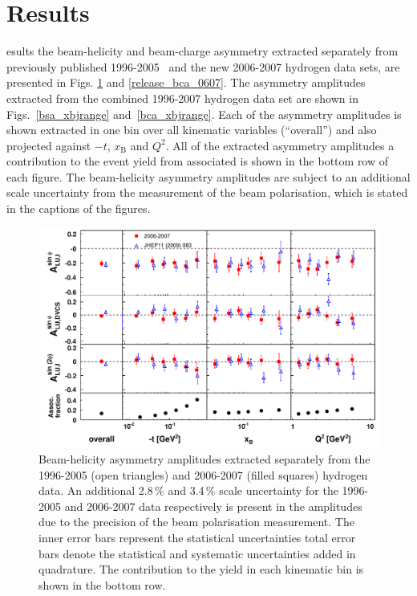 \section{Results}
esults  the beam-helicity and beam-charge asymmetry  extracted separately from previously published 1996-2005~\cite{Air09} and the new 2006-2007 hydrogen data sets, are presented in Figs. \ref{release_bsa_0607} and \ref{release_bca_0607}. The asymmetry amplitudes extracted from the combined 1996-2007 hydrogen data set are shown in Figs.~\ref{bsa_xbjrange} and~\ref{bca_xbjrange}. Each of the asymmetry amplitudes is shown extracted in one bin over all kinematic variables (``overall'') and also projected against $-t$, $x_{\textrm{B}}$ and $Q^{2}$. All of the extracted asymmetry amplitudes  a  contribution to the event yield from associated  is shown in the bottom row of each figure. The beam-helicity asymmetry amplitudes are subject to an additional scale uncertainty from the measurement of the beam polarisation, which is stated in the captions of the figures.
\begin{figure}
\begin{center}
\includegraphics[width=15cm,keepaspectratio]{bsadvcsplots_eml_par13_bin6_release_pic_update_0607_9605}
  \caption{Beam-helicity asymmetry amplitudes extracted separately from
the 1996-2005 (open triangles) and 2006-2007 (filled squares)
hydrogen data.   
An additional 2.8\,\% and 3.4\,\% scale uncertainty for the 1996-2005 and
2006-2007 data respectively is present in the amplitudes due to the precision of
the beam polarisation measurement. The inner error bars represent the statistical uncertainties total error bars denote the statistical and systematic uncertainties added in quadrature. The  contribution  to the yield in each kinematic bin is shown in the bottom row.}
 \label{release_bsa_0607}
\end{center}
 \end{figure}
